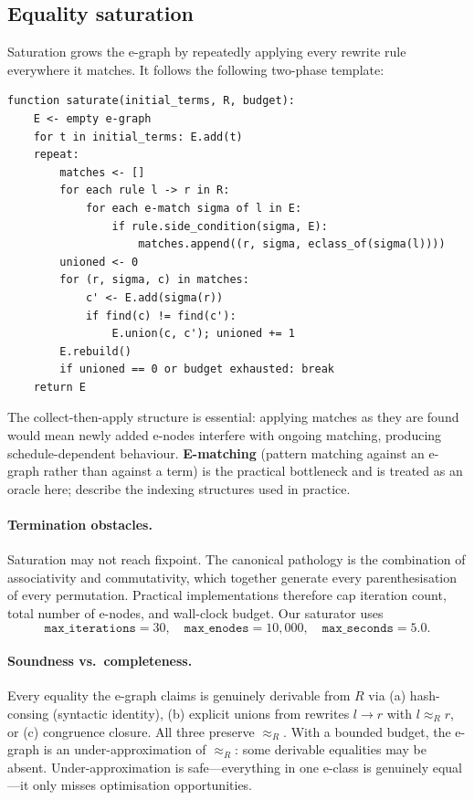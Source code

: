 \documentclass[12pt]{article}
\begin{document}
\subsection{Equality saturation}\label{app:saturation}

Saturation grows the e-graph by repeatedly applying every rewrite rule everywhere it matches. It follows the following two-phase template:
\begin{lstlisting}
function saturate(initial_terms, R, budget):
    E <- empty e-graph
    for t in initial_terms: E.add(t)
    repeat:
        matches <- []
        for each rule l -> r in R:
            for each e-match sigma of l in E:
                if rule.side_condition(sigma, E):
                    matches.append((r, sigma, eclass_of(sigma(l))))
        unioned <- 0
        for (r, sigma, c) in matches:
            c' <- E.add(sigma(r))
            if find(c) != find(c'):
                E.union(c, c'); unioned += 1
        E.rebuild()
        if unioned == 0 or budget exhausted: break
    return E
\end{lstlisting}
The collect-then-apply structure is essential: applying matches as they are found would mean newly added e-nodes interfere with ongoing matching, producing schedule-dependent behaviour. \textbf{E-matching} (pattern matching against an e-graph rather than against a term) is the practical bottleneck and is treated as an oracle here; \citet{willsey2021egg} describe the indexing structures used in practice.

\paragraph{Termination obstacles.} Saturation may not reach fixpoint. The canonical pathology is the combination of associativity and commutativity, which together generate every parenthesisation of every permutation. Practical implementations therefore cap iteration count, total number of e-nodes, and wall-clock budget. Our saturator uses
\[
  \texttt{max\_iterations} = 30, \quad \texttt{max\_enodes} = 10{,}000, \quad \texttt{max\_seconds} = 5.0.
\]

\paragraph{Soundness vs.\ completeness.} Every equality the e-graph claims is genuinely derivable from $R$ via (a) hash-consing (syntactic identity), (b) explicit unions from rewrites $l \to r$ with $l \approx_R r$, or (c) congruence closure. All three preserve $\approx_R$. With a bounded budget, the e-graph is an under-approximation of $\approx_R$: some derivable equalities may be absent. Under-approximation is safe---everything in one e-class is genuinely equal---it only misses optimisation opportunities.
\end{document}
